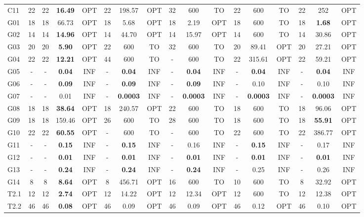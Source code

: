 \begin{table}[!htbp]
{\begin{tabular}{@{}l c ccc ccc ccc ccc ccc@{}}
C11 & 22 & 22 & \textbf{16.49} & OPT & 22 & 198.57 & OPT & 32 & 600 & TO & 22 & 600 & TO & 22 & 252 & OPT \\
G01 & 18 & 18 & 66.73 & OPT & 18 & 5.68 & OPT & 18 & 2.19 & OPT & 18 & 600 & TO & 18 & \textbf{1.68} & OPT \\
G02 & 14 & 14 & \textbf{14.96} & OPT & 14 & 44.70 & OPT & 14 & 15.97 & OPT & 14 & 600 & TO & 14 & 30.86 & OPT \\
G03 & 20 & 20 & \textbf{5.90} & OPT & 22 & 600 & TO & 32 & 600 & TO & 20 & 89.41 & OPT & 20 & 27.21 & OPT \\
G04 & 22 & 22 & \textbf{12.21} & OPT & 44 & 600 & TO & - & 600 & TO & 22 & 315.61 & OPT & 22 & 59.21 & OPT \\
G05 & - & - & \textbf{0.04} & INF & - & \textbf{0.04} & INF & - & \textbf{0.04} & INF & - & \textbf{0.04} & INF & - & \textbf{0.04} & INF \\
G06 & - & - & \textbf{0.09} & INF & - & \textbf{0.09} & INF & - & \textbf{0.09} & INF & - & 0.10 & INF & - & 0.10 & INF \\
G07 & - & - & 0.01 & INF & - & \textbf{0.0003} & INF & - & \textbf{0.0003} & INF & - & \textbf{0.0003} & INF & - & \textbf{0.0003} & INF \\
G08 & 18 & 18 & \textbf{38.64} & OPT & 18 & 240.57 & OPT & 22 & 600 & TO & 18 & 600 & TO & 18 & 96.06 & OPT \\
G09 & 18 & 18 & 159.46 & OPT & 26 & 600 & TO & 28 & 600 & TO & 18 & 600 & TO & 18 & \textbf{55.91} & OPT \\
G10 & 22 & 22 & \textbf{60.55} & OPT & - & 600 & TO & - & 600 & TO & 22 & 600 & TO & 22 & 386.77 & OPT \\
G11 & - & - & \textbf{0.15} & INF & - & \textbf{0.15} & INF & - & 0.16 & INF & - & \textbf{0.15} & INF & - & 0.17 & INF \\
G12 & - & - & \textbf{0.01} & INF & - & \textbf{0.01} & INF & - & \textbf{0.01} & INF & - & \textbf{0.01} & INF & - & \textbf{0.01} & INF \\
G13 & - & - & \textbf{0.24} & INF & - & \textbf{0.24} & INF & - & \textbf{0.24} & INF & - & 0.25 & INF & - & 0.26 & INF \\
G14 & 8 & 8 & \textbf{8.64} & OPT & 8 & 456.71 & OPT & 16 & 600 & TO & 10 & 600 & TO & 8 & 32.92 & OPT \\
T2.1 & 12 & 12 & \textbf{2.74} & OPT & 12 & 14.22 & OPT & 12 & 12.34 & OPT & 12 & 600 & TO & 12 & 12.38 & OPT \\
T2.2 & 46 & 46 & \textbf{0.08} & OPT & 46 & 0.09 & OPT & 46 & 0.09 & OPT & 46 & 0.12 & OPT & 46 & 0.10 & OPT \\

\end{tabular}}
\end{table}

